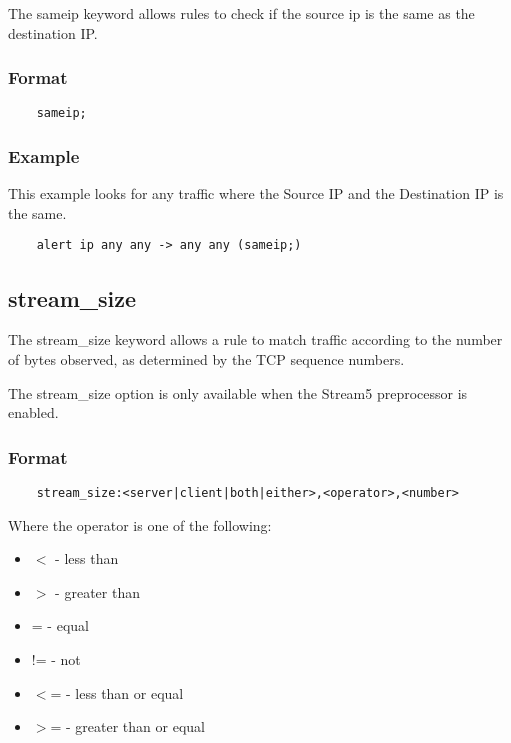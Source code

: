 \documentclass[english]{report}
\newenvironment{note}{
\samepage
    \vspace{10pt}{\textsf{
        {\hspace{7pt}\Huge{$\triangle$\hspace{-12.5pt}{\Large{$^!$}}}}\hspace{5pt}
        {\Large{NOTE}}
    }
    }
   \begin{center}
    \par\vspace{-17pt}

    \begin{lrbox}{\savepar}
    \begin{minipage}[r]{6in}
}
{
    \end{minipage}
    \end{lrbox}
    \fbox{
        \usebox{
            \savepar
	}
    }
    \par\vskip10pt
    \end{center}
}
\newenvironment{note}{
        \begin{rawhtml}
        <p><table border="1"><tr><td><b>
        Note:&nbsp;&nbsp;</b>
        \end{rawhtml}
}{
        \begin{rawhtml}
        </b></td></tr></table></p>
        \end{rawhtml}
}
\begin{document}
The sameip keyword allows rules to check if the source ip is the same as the
destination IP.

\subsubsection{Format}

\begin{verbatim}
    sameip;
\end{verbatim}

\subsubsection{Example}

This example looks for any traffic where the Source IP and the Destination IP
is the same.

\begin{verbatim}
    alert ip any any -> any any (sameip;)
\end{verbatim}

\subsection{stream\_size}

The stream\_size keyword allows a rule to match traffic according to the number
of bytes observed, as determined by the TCP sequence numbers.  

\begin{note}

The stream\_size option is only available when the Stream5 preprocessor is
enabled.

\end{note}

\subsubsection{Format}

\begin{verbatim}
    stream_size:<server|client|both|either>,<operator>,<number>
\end{verbatim}

Where the operator is one of the following:

\begin{itemize}
\item $<$ - less than
\item $>$ - greater than
\item = - equal
\item != - not
\item $<$= - less than or equal
\item $>$= - greater than or equal
\end{itemize}
\end{document}
